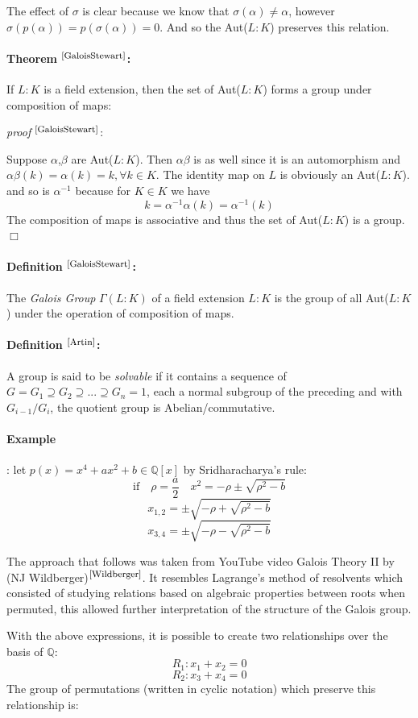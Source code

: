 \documentclass{article}
\begin{document}
The effect of $\sigma$ is clear because we know that $\sigma(\alpha) \ne \alpha$, however  $\sigma(p(\alpha)) = p(\sigma(\alpha)) = 0$. And so the  Aut($L: K$) preserves this relation.

\paragraph{Theorem $^{\textrm{\footnotesize\cite{GaloisStewart}}}$:}If $L:K$ is a field extension, then the set of Aut($L:K$) forms a group under composition of maps:
\par
\textit{proof} $^{\textrm{\footnotesize\cite{GaloisStewart}}}$:
\par 
Suppose  $\alpha$,$\beta$ are Aut($L:K$). Then $\alpha\beta$ is as well since it is an automorphism and $\alpha\beta(k)=\alpha(k) = k, \forall k\in K$. The identity map on $L$ is obviously an Aut($L: K$). and so is $\alpha^{-1}$ because for $K\in K$ we have 
$$k = \alpha^{-1}\alpha(k) = \alpha^{-1}(k)$$
The composition of maps is associative and thus the set of Aut($L: K$) is a group. $\Box$

\paragraph{Definition $^{\textrm{\footnotesize\cite{GaloisStewart}}}$:} The \textit{Galois Group} $\Gamma(L:K)$ of a field extension $L:K$ is the group of all Aut($L:K$) under the operation of composition of maps.

\paragraph{Definition $^{\textrm{\footnotesize\cite{Artin}}}$:} A group is said to be \textit{solvable} if it contains a sequence of $G = G_1 \supseteq G_2 \supseteq ... \supseteq G_n = 1$, each a normal subgroup of the preceding and with $G_{i-1}/G_i$, the quotient group is Abelian/commutative.

\paragraph{Example}: let $p(x) = x^4 + ax^2 + b \in \mathbb{Q}[x]$ by Sridharacharya's rule:
$$\textrm{if} \quad \rho = \frac{a}{2} \quad x^2 = -\rho \pm \sqrt{\rho^2-b}$$
$$x_{1,2} = \pm \sqrt{-\rho + \sqrt{\rho^2-b}}$$
$$x_{3,4} = \pm \sqrt{-\rho - \sqrt{\rho^2-b}}$$

The approach that follows was taken from YouTube video Galois Theory II by (NJ Wildberger)$^{\textrm{\footnotesize\cite{Wildberger}}}$. It resembles Lagrange's method of resolvents which consisted of studying relations based on algebraic properties between roots when permuted, this allowed further interpretation of the structure of the Galois group.
\par
With the above expressions, it is possible to create two relationships over the basis of $\mathbb{Q}$:
$$R_1 : x_1 +x_2 = 0$$
$$R_2 : x_3 +x_4 = 0$$
The group of permutations (written in cyclic notation) which preserve this relationship is:
\end{document}
